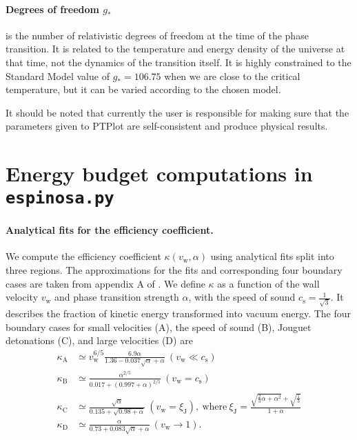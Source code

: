 \documentclass[10pt]{article}
\begin{document}
\paragraph{Degrees of freedom $g_*$} is the number of relativistic degrees of freedom at the time of the phase transition. It is related to the temperature and energy density of the universe at that time, not the dynamics of the transition itself. It is highly constrained to the Standard Model value of $g_*=106.75$ \cite{weir18} when we are close to the critical temperature, but it can be varied according to the chosen model.

\vspace{0.5cm} It should be noted that currently the user is responsible for making sure that the parameters given to PTPlot are self-consistent and produce physical results.

\section{Energy budget computations in \texttt{espinosa.py}}

\paragraph{Analytical fits for the efficiency coefficient.}
We compute the efficiency coefficient $\kappa(v_\mathrm{w},\alpha)$ using analytical fits split into three regions. The approximations for the fits and corresponding four boundary cases are taken from appendix A of \cite{espinosa10}. We define $\kappa$ as a function of the wall velocity $v_\mathrm{w}$ and phase transition strength $\alpha$, with the speed of sound $c_\mathrm{s}=\frac{1}{\sqrt{3}}$. It describes the fraction of kinetic energy transformed into vacuum energy.
\newpage
The four boundary cases for small velocities (A), the speed of sound (B), Jouguet detonations (C), and large velocities (D) are
\begin{align}
    \kappa_\mathrm{A} &\simeq v_\mathrm{w}^{6/5} \frac{6.9\alpha}{1.36-0.037\sqrt{\alpha}+\alpha} \ (v_\mathrm{w} \ll c_\mathrm{s}) \\
    \kappa_\mathrm{B} &\simeq \frac{\alpha^{2/5}}{0.017+(0.997+\alpha)^{2/5}} \ (v_\mathrm{w} = c_\mathrm{s}) \\
    \kappa_\mathrm{C} &\simeq \frac{\sqrt{\alpha}}{0.135+\sqrt{0.98+\alpha}} \ (v_\mathrm{w} = \xi_\mathrm{J}), \ \mathrm{where} \ \xi_\mathrm{J} = \frac{\sqrt{\frac{2}{3}\alpha+\alpha^2}+\sqrt{\frac{1}{3}}}{1+\alpha} \\
    \kappa_\mathrm{D} &\simeq \frac{\alpha}{0.73+0.083\sqrt{\alpha}+\alpha} \ (v_\mathrm{w} \rightarrow 1).
\end{align}
\end{document}
